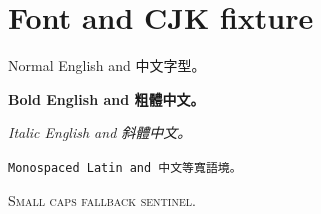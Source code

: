 


\chapter*{Font and CJK fixture}

Normal English and 中文字型。

\textbf{Bold English and 粗體中文。}

\textit{Italic English and 斜體中文。}

\texttt{Monospaced Latin and 中文等寬語境。}

\textsc{Small caps fallback sentinel.}


